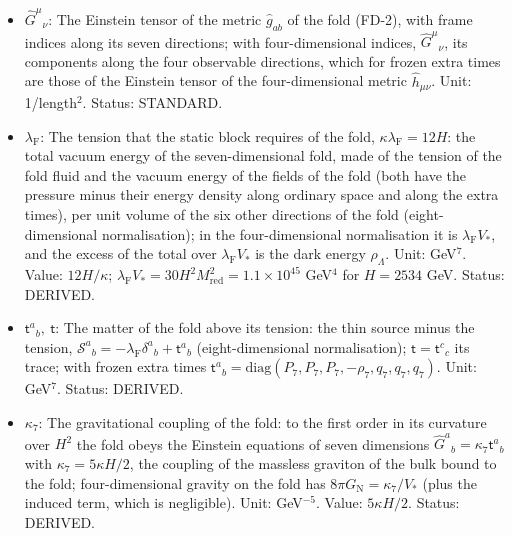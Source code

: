 \documentclass[
  10pt,
]{article}
\begin{document}
\begin{itemize}
  \(\delta^{M_1M_2\cdots}_{N_1N_2\cdots}\), the determinant of the
  square matrix of the Kronecker deltas \(\delta^{M_a}_{N_b}\) (\(+1\)
  or \(-1\) if the upper indices are an even or odd permutation of the
  lower ones, 0 otherwise). Status: STANDARD.
\item
  \(\hat G^\mu{}_\nu\): The Einstein tensor of the metric
  \(\hat g_{ab}\) of the fold (FD-2), with frame indices along its seven
  directions; with four-dimensional indices, \(\hat G^\mu{}_\nu\), its
  components along the four observable directions, which for frozen
  extra times are those of the Einstein tensor of the four-dimensional
  metric \(\hat h_{\mu\nu}\). Unit: 1/length\(^2\). Status: STANDARD.
\item
  \(\lambda_{\mathrm{F}}\): The tension that the static block requires
  of the fold, \(\kappa\lambda_{\mathrm{F}} = 12H\): the total vacuum
  energy of the seven-dimensional fold, made of the tension of the fold
  fluid and the vacuum energy of the fields of the fold (both have the
  pressure minus their energy density along ordinary space and along the
  extra times), per unit volume of the six other directions of the fold
  (eight-dimensional normalisation); in the four-dimensional
  normalisation it is \(\lambda_{\mathrm{F}}V_*\), and the excess of the
  total over \(\lambda_{\mathrm{F}}V_*\) is the dark energy
  \(\rho_\Lambda\). Unit: GeV\(^7\). Value: \(12H/\kappa\);
  \(\lambda_{\mathrm{F}}V_* = 30H^2M_{\mathrm{red}}^2 = 1.1\times10^{45}\)
  GeV\(^4\) for \(H = 2534\) GeV. Status: DERIVED.
\item
  \(\mathsf{t}^a{}_b,\ \mathsf{t}\): The matter of the fold above its
  tension: the thin source minus the tension,
  \(\mathcal{S}^a{}_b = -\lambda_{\mathrm{F}}\delta^a{}_b + \mathsf{t}^a{}_b\)
  (eight-dimensional normalisation); \(\mathsf{t} = \mathsf{t}^c{}_c\)
  its trace; with frozen extra times
  \(\mathsf{t}^a{}_b = \mathrm{diag}(P_7, P_7, P_7, -\rho_7, q_7, q_7, q_7)\).
  Unit: GeV\(^7\). Status: DERIVED.
\item
  \(\kappa_7\): The gravitational coupling of the fold: to the first
  order in its curvature over \(H^2\) the fold obeys the Einstein
  equations of seven dimensions
  \(\hat G^a{}_b = \kappa_7\mathsf{t}^a{}_b\) with
  \(\kappa_7 = 5\kappa H/2\), the coupling of the massless graviton of
  the bulk bound to the fold; four-dimensional gravity on the fold has
  \(8\pi G_{\mathrm{N}} = \kappa_7/V_*\) (plus the induced term, which
  is negligible). Unit: GeV\(^{-5}\). Value: \(5\kappa H/2\). Status:
  DERIVED.
\end{itemize}
\end{document}
